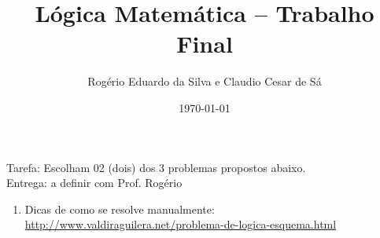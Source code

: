 \documentclass[a4paper,11pt]{article}
\title{Lógica Matemática -- Trabalho Final}
\author{Rogério Eduardo da Silva e Claudio Cesar de Sá}
\date{\today}
\begin{document}
\maketitle

\begin{flushleft}

Tarefa: Escolham 02 (dois) dos 3 problemas propostos abaixo.\\
Entrega: a definir com Prof. Rogério \\ 

\end{flushleft}

\begin{enumerate}

\item Dicas de como se resolve manualmente:\\
\url{http://www.valdiraguilera.net/problema-de-logica-esquema.html}
\end{enumerate}
\end{document}
